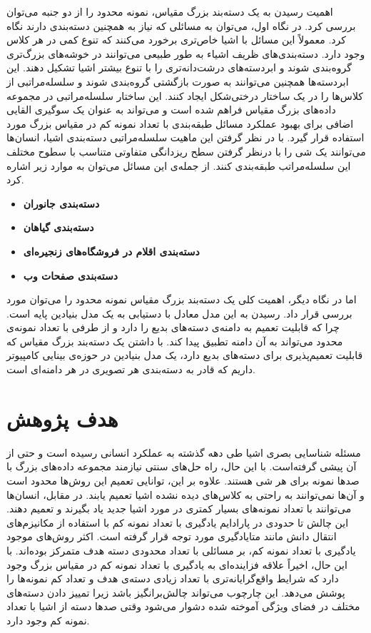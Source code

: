 اهمیت رسیدن به یک دسته‌بند بزرگ مقیاس، نمونه محدود را از دو جنبه می‌توان بررسی کرد. در نگاه اول، می‌توان به مسائلی که نیاز به همچنین دسته‌بندی دارند نگاه کرد.
معمولاً این مسائل با اشیا خاص‌تری برخورد می‌کنند که تنوع کمی در هر کلاس وجود دارد. دسته‌بندی‌های ظریف اشیاء به طور طبیعی می‌توانند در خوشه‌های بزرگ‌تری گروه‌بندی شوند و ابردسته‌های درشت‌دانه‌تری را با تنوع بیشتر اشیا تشکیل دهند. این ابردسته‌ها همچنین می‌توانند به صورت بازگشتی گروه‌بندی شوند و سلسله‌مراتبی از کلاس‌ها را در یک ساختار درختی‌شکل ایجاد کنند. این ساختار سلسله‌مراتبی در مجموعه داده‌های بزرگ مقیاس فراهم شده است و می‌تواند به عنوان یک سوگیری القایی اضافی برای بهبود عملکرد مسائل طبقه‌بندی با تعداد نمونه کم در مقیاس بزرگ مورد استفاده قرار گیرد. با در نظر گرفتن این ماهیت سلسله‌مراتبی دسته‌بندی اشیا، انسان‌ها می‌توانند یک شی را با درنظر گرفتن سطح ریزدانگی متفاوتی متناسب با سطوح مختلف این سلسله‌مراتب طبقه‌بندی کنند. از جمله‌ی این مسائل می‌توان به موارد زیر اشاره کرد.
\begin{itemize}
	\item 
	\textbf{دسته‌بندی جانوران}

	\item 
	\textbf{دسته‌بندی گیاهان}
	
	\item 
	\textbf{دسته‌بندی اقلام در فروشگاه‌های زنجیره‌ای}

	\item 
	\textbf{دسته‌بندی صفحات وب}	
\end{itemize}

اما در نگاه دیگر، اهمیت کلی یک دسته‌بند بزرگ مقیاس نمونه محدود را می‌توان مورد بررسی قرار داد. رسیدن به این مدل معادل با دستیابی به یک مدل بنیادین پایه 
است. چرا که قابلیت تعمیم به دامنه‌ی دسته‌های بدیع را دارد و از طرفی با تعداد نمونه‌ی محدود می‌تواند به آن دامنه تطبیق پیدا کند. با داشتن یک دسته‌بند بزرگ مقیاس که قابلیت تعمیم‌پذیری برای دسته‌های بدیع دارد، یک مدل بنیادین در حوزه‌ی بینایی کامپیوتر داریم که قادر به دسته‌بندی هر تصویری در هر دامنه‌ای است.

\section{هدف پژوهش}


 مسئله شناسایی بصری اشیا طی دهه گذشته به عملکرد انسانی رسیده است و حتی از آن پیشی گرفته‌است. با این حال، راه حل‌های سنتی نیازمند مجموعه داده‌های بزرگ با صدها نمونه برای هر شی هستند. علاوه بر این، توانایی تعمیم این روش‌ها محدود است و آن‌ها نمی‌توانند به راحتی به کلاس‌های دیده نشده اشیا تعمیم یابند. در مقابل، انسان‌ها می‌توانند با تعداد نمونه‌های بسیار کمتری در مورد اشیا جدید یاد بگیرند و تعمیم دهند. این چالش تا حدودی در پارادایم یادگیری با تعداد نمونه کم با استفاده از مکانیزم‌های انتقال دانش مانند متایادگیری مورد توجه قرار گرفته است. اکثر روش‌های موجود یادگیری با تعداد نمونه کم، بر مسائلی با تعداد محدودی دسته هدف متمرکز بوده‌اند. با این حال، اخیراً علاقه فزاینده‌ای به یادگیری با تعداد نمونه کم در مقیاس بزرگ وجود دارد
 \cite{Chen2023KnowledgeDW,Guan2020LargeScaleCF,Li2019LargeScaleFL}
  که شرایط واقع‌گرایانه‌تری با تعداد زیادی دسته‌ی هدف و تعداد کم نمونه‌ها را پوشش می‌دهد. این چارچوب می‌تواند چالش‌برانگیز باشد زیرا تمییز دادن دسته‌های مختلف در فضای ویژگی آموخته شده دشوار می‌شود وقتی صدها دسته از اشیا با تعداد نمونه کم وجود دارد.

